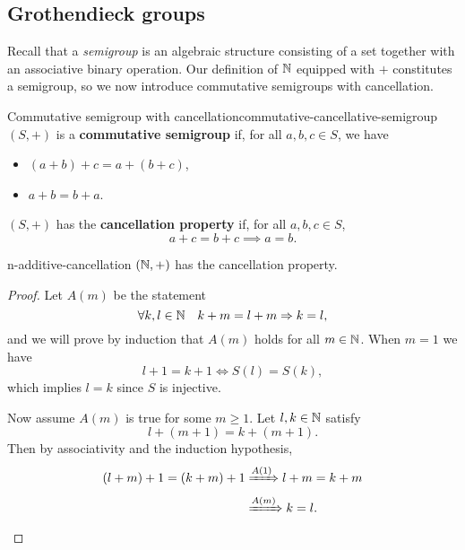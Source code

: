 \documentclass[master.tex]{subfiles}
\begin{document}
    \subsection{Grothendieck groups}
        Recall that a \emph{semigroup} is an algebraic structure consisting of a set together with an associative binary operation.
        Our definition of $\mathbb{N}$ equipped with $+$ constitutes a semigroup, so we now introduce commutative semigroups with cancellation.
        \begin{definition}{Commutative semigroup with cancellation}{commutative-cancellative-semigroup}
            $(S, +)$ is a \textbf{commutative semigroup} if, for all $a, b, c \in S$, we have
            \begin{itemize}
                \item $(a + b) + c = a + (b + c)$,
                \item $a + b = b + a$.
            \end{itemize}
            $(S, +)$ has the \textbf{cancellation property} if, for all $a, b, c \in S$,
            \[
                a + c = b + c \implies a = b
            .\]
        \end{definition}

        \begin{lemma}{}{n-additive-cancellation}
            $(\mathbb{N}, +)$ has the cancellation property.
            \hr{}
            \begin{proof}
                Let $A(m)$ be the statement
                \[
                    \forall k, l \in \mathbb{N} \quad k + m = l + m \Rightarrow k = l
                ,\]
                and we will prove by induction that $A(m)$ holds for all $m \in \mathbb{N}$.
                When $m = 1$ we have
                \[
                    l + 1 = k + 1 \iff S(l) = S(k)  
                ,\]
                which implies $l = k$ since $S$ is injective.

                Now assume $A(m)$ is true for some $m \geq 1$.
                Let $l, k \in \mathbb{N}$ satisfy
                \[
                    l + (m + 1) = k + (m + 1)
                .\]
                Then by associativity and the induction hypothesis,
                \begin{align*}
                    (l + m) + 1 = (k + m) + 1 &\xRightarrow{A(1)} l + m = k + m \\
                    &\xRightarrow{A(m)} k = l.
                \end{align*}
            \end{proof}
        \end{lemma}
\end{document}
